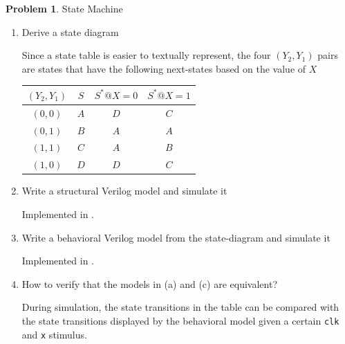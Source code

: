 \documentclass[10pt]{article}
\theoremstyle{definition}
\newtheorem{problem}{Problem}
\begin{document}
  \begin{problem}
    State Machine

    \begin{enumerate}
      \item Derive a state diagram

      Since a state table is easier to textually represent, the four $(Y_2, Y_1)$ pairs are states that have the following next-states based on the value of $X$

      \begin{center}
      \begin{tabular}{ c c | c c }
      $(Y_2, Y_1)$ & $S$ & %
      $S^* @ X = 0$ & $S^* @ X = 1$ \\
      \hline
      $(0, 0)$ & $A$ &
      $D$ & $C$ \\
      $(0, 1)$ & $B$ &
      $A$ & $A$ \\
      $(1, 1)$ & $C$ &
      $A$ & $B$ \\
      $(1, 0)$ & $D$ &
      $D$ & $C$ \\
      \end{tabular}
      \end{center}

      \item Write a structural Verilog model and simulate it

      Implemented in \texttt{}.

      \item Write a behavioral Verilog model from the state-diagram and simulate it

      Implemented in \texttt{}.

      \item How to verify that the models in (a) and (c) are equivalent?

      During simulation, the state transitions in the table can be compared with the state transitions displayed by the behavioral model given a certain \texttt{clk} and \texttt{x} stimulus.

    \end{enumerate}
  \end{problem}
\end{document}
